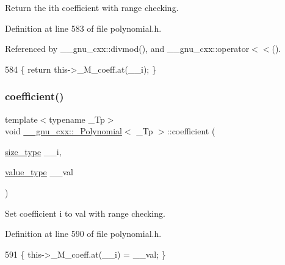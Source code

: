 Return the {\ttfamily ith} coefficient with range checking. 

Definition at line 583 of file polynomial.\+h.



Referenced by \+\_\+\+\_\+gnu\+\_\+cxx\+::divmod(), and \+\_\+\+\_\+gnu\+\_\+cxx\+::operator$<$$<$().


\begin{DoxyCode}
584       \{ \textcolor{keywordflow}{return} this->\_M\_coeff.at(\_\_i); \}
\end{DoxyCode}
\mbox{\label{class____gnu__cxx_1_1__Polynomial_a191611909a0461c449984a0898bce38f}} 
\subsubsection{\texorpdfstring{coefficient()}{coefficient()}\hspace{0.1cm}{\footnotesize\ttfamily [2/2]}}
{\footnotesize\ttfamily template$<$typename \+\_\+\+Tp$>$ \\
void \hyperlink{class____gnu__cxx_1_1__Polynomial}{\+\_\+\+\_\+gnu\+\_\+cxx\+::\+\_\+\+Polynomial}$<$ \+\_\+\+Tp $>$\+::coefficient (\begin{DoxyParamCaption}\item[{\hyperlink{class____gnu__cxx_1_1__Polynomial_a6afe219c123c7a2fdc5abac8a6639053}{size\+\_\+type}}]{\+\_\+\+\_\+i,  }\item[{\hyperlink{class____gnu__cxx_1_1__Polynomial_a725563351f50e76084a7a016c06f8a53}{value\+\_\+type}}]{\+\_\+\+\_\+val }\end{DoxyParamCaption})\hspace{0.3cm}{\ttfamily [inline]}}

Set coefficient {\ttfamily i} to {\ttfamily val} with range checking. 

Definition at line 590 of file polynomial.\+h.


\begin{DoxyCode}
591       \{ this->\_M\_coeff.at(\_\_i) = \_\_val; \}
\end{DoxyCode}
\mbox{\label{class____gnu__cxx_1_1__Polynomial_a19a59153698d550a7473860bb8cadb6f}} 
